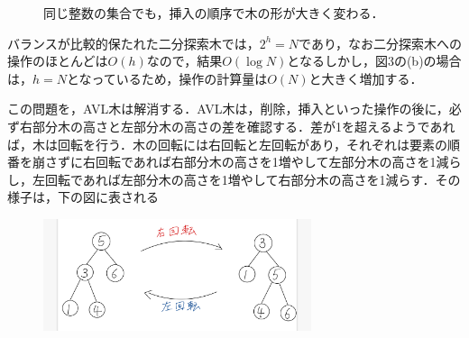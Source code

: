 \documentclass[
]{ltjarticle}
\begin{document}
\begin{figure}%
    \centering
    \qquad
    \caption{同じ整数の集合でも，挿入の順序で木の形が大きく変わる．}
\end{figure}

バランスが比較的保たれた二分探索木では，\(2^h = N\)であり，なお二分探索木への操作のほとんどは\(O(h)\)なので，結果\(O(\log N)\)となるしかし，図3の(b)の場合は，\(h=N\)となっているため，操作の計算量は\(O(N)\)と大きく増加する．

この問題を，AVL木は解消する．AVL木は，削除，挿入といった操作の後に，必ず右部分木の高さと左部分木の高さの差を確認する．差が1を超えるようであれば，木は回転を行う．木の回転には右回転と左回転があり，それぞれは要素の順番を崩さずに右回転であれば右部分木の高さを1増やして左部分木の高さを1減らし，左回転であれば左部分木の高さを1増やして右部分木の高さを1減らす．その様子は，下の図に表される

\begin{figure}
\centering
\includegraphics[width=0.7\textwidth]{rotate.jpeg}
\end{figure}
\end{document}
